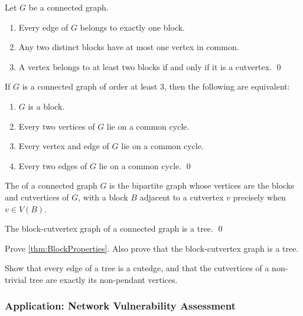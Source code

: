 \begin{Theorem}\label{thm:BlockProperties}
Let $G$ be a connected graph.
\begin{enumerate}[label=(\roman*)]
\item Every edge of $G$ belongs to exactly one block.
\item Any two distinct blocks have at most one vertex in common.
\item A vertex belongs to at least two blocks if and only if it is a cutvertex. \qed
\end{enumerate}
\end{Theorem}

\begin{Theorem}\label{thm:BlockChar}
If $G$ is a connected graph of order at least $3$, then the following are equivalent:
\begin{enumerate}[label=(\roman*)]
\item\label{it:BlockChar1} $G$ is a block.
\item \label{it:BlockChar2} Every two vertices of $G$ lie on a common cycle.
\item\label{it:BlockChar3} Every vertex and edge of $G$ lie on a common cycle.
\item\label{it:BlockChar4} Every two edges of $G$ lie on a common cycle. \qed
\end{enumerate}
\end{Theorem}

The  of a connected graph $G$ is the bipartite graph whose vertices are the blocks and cutvertices of $G$, with a block $B$ adjacent to a cutvertex $v$ precisely when $v\in V(B)$.

\begin{Theorem}
The block-cutvertex graph of a connected graph is a tree. \qed
\end{Theorem}

\begin{Exercise}
Prove \cref{thm:BlockProperties}. Also prove that the block-cutvertex graph is a tree.
\end{Exercise}

\begin{Exercise}
Show that every edge of a tree is a cutedge, and that the cutvertices of a non-trivial tree are exactly its non-pendant vertices.
\end{Exercise}

\subsubsection{Application: Network Vulnerability Assessment}\label{subsubsec:Vulnerability}

